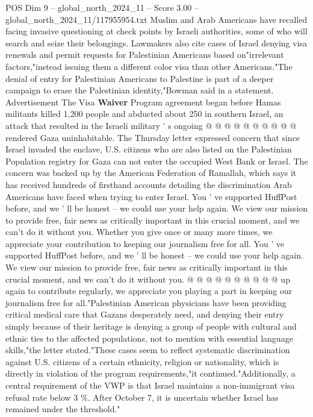 \begin{textsample}{POS Dim 9 – global\_north\_2024\_11 – Score 3.00 – global\_north\_2024\_11/117955954.txt}
Muslim and Arab Americans have recalled facing invasive questioning at check points by Israeli authorities, some of who will search and seize their belongings.
Lawmakers also cite cases of Israel denying visa renewals and permit requests for Palestinian Americans based on"irrelevant factors,"instead issuing them a different color visa than other Americans."The denial of entry for Palestinian Americans to Palestine is part of a deeper campaign to erase the Palestinian identity,"Bowman said in a statement.
Advertisement The Visa \textbf{Waiver} Program agreement began before Hamas militants killed 1,200 people and abducted about 250 in southern Israel, an attack that resulted in the Israeli military ' s ongoing @ @ @ @ @ @ @ @ @ @ rendered Gaza uninhabitable.
The Thursday letter expressed concern that since Israel invaded the enclave, U.S. citizens who are also listed on the Palestinian Population registry for Gaza can not enter the occupied West Bank or Israel.
The concern was backed up by the American Federation of Ramallah, which says it has received hundreds of firsthand accounts detailing the discrimination Arab Americans have faced when trying to enter Israel.
You ' ve supported HuffPost before, and we ' ll be honest -- we could use your help again.
We view our mission to provide free, fair news as critically important in this crucial moment, and we can't do it without you.
Whether you give once or many more times, we appreciate your contribution to keeping our journalism free for all.
You ' ve supported HuffPost before, and we ' ll be honest -- we could use your help again.
We view our mission to provide free, fair news as critically important in this crucial moment, and we can't do it without you. @ @ @ @ @ @ @ @ @ @ up again to contribute regularly, we appreciate you playing a part in keeping our journalism free for all."Palestinian American physicians have been providing critical medical care that Gazans desperately need, and denying their entry simply because of their heritage is denying a group of people with cultural and ethnic ties to the affected populations, not to mention with essential language skills,"the letter stated."These cases seem to reflect systematic discrimination against U.S. citizens of a certain ethnicity, religion or nationality, which is directly in violation of the program requirements,"it continued."Additionally, a central requirement of the VWP is that Israel maintains a non-immigrant visa refusal rate below 3 \%.
After October 7, it is uncertain whether Israel has remained under the threshold."

\end{textsample}
